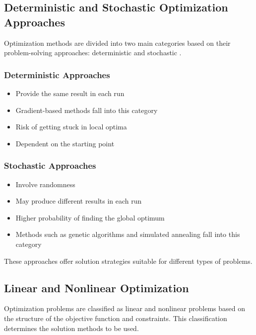 \subsection{Deterministic and Stochastic Optimization Approaches}
Optimization methods are divided into two main categories based on their problem-solving approaches: deterministic  and stochastic .

\subsubsection{Deterministic Approaches}
\begin{itemize}
    \item Provide the same result in each run
    \item Gradient-based methods fall into this category
    \item Risk of getting stuck in local optima
    \item Dependent on the starting point
\end{itemize}

\subsubsection{Stochastic Approaches}
\begin{itemize}
    \item Involve randomness
    \item May produce different results in each run
    \item Higher probability of finding the global optimum
    \item Methods such as genetic algorithms and simulated annealing fall into this category
\end{itemize}

These approaches offer solution strategies suitable for different types of problems. 

\subsection{Linear and Nonlinear Optimization}
Optimization problems are classified as linear and nonlinear problems based on the structure of the objective function and constraints. This classification determines the solution methods to be used.

